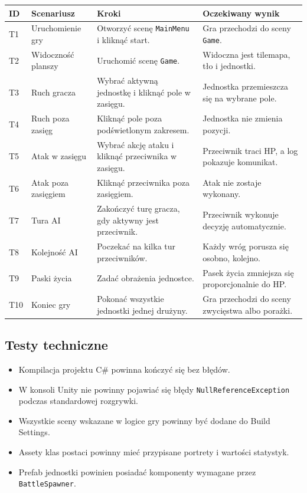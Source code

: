 \documentclass[12pt,a4paper]{article}
\begin{document}
\begin{longtable}{p{1cm} p{4cm} p{5cm} p{4cm}}
\toprule
\textbf{ID} & \textbf{Scenariusz} & \textbf{Kroki} & \textbf{Oczekiwany wynik} \\
\midrule
\endhead
T1 & Uruchomienie gry & Otworzyć scenę \texttt{MainMenu} i kliknąć start. & Gra przechodzi do sceny \texttt{Game}. \\[4pt]
T2 & Widoczność planszy & Uruchomić scenę \texttt{Game}. & Widoczna jest tilemapa, tło i jednostki. \\[4pt]
T3 & Ruch gracza & Wybrać aktywną jednostkę i kliknąć pole w zasięgu. & Jednostka przemieszcza się na wybrane pole. \\[4pt]
T4 & Ruch poza zasięg & Kliknąć pole poza podświetlonym zakresem. & Jednostka nie zmienia pozycji. \\[4pt]
T5 & Atak w zasięgu & Wybrać akcję ataku i kliknąć przeciwnika w zasięgu. & Przeciwnik traci HP, a log pokazuje komunikat. \\[4pt]
T6 & Atak poza zasięgiem & Kliknąć przeciwnika poza zasięgiem. & Atak nie zostaje wykonany. \\[4pt]
T7 & Tura AI & Zakończyć turę gracza, gdy aktywny jest przeciwnik. & Przeciwnik wykonuje decyzję automatycznie. \\[4pt]
T8 & Kolejność AI & Poczekać na kilka tur przeciwników. & Każdy wróg porusza się osobno, kolejno. \\[4pt]
T9 & Paski życia & Zadać obrażenia jednostce. & Pasek życia zmniejsza się proporcjonalnie do HP. \\[4pt]
T10 & Koniec gry & Pokonać wszystkie jednostki jednej drużyny. & Gra przechodzi do sceny zwycięstwa albo porażki. \\
\bottomrule
\end{longtable}

\subsection{Testy techniczne}

\begin{itemize}
    \item Kompilacja projektu C\# powinna kończyć się bez błędów.
    \item W konsoli Unity nie powinny pojawiać się błędy \texttt{NullReferenceException} podczas standardowej rozgrywki.
    \item Wszystkie sceny wskazane w logice gry powinny być dodane do Build Settings.
    \item Assety klas postaci powinny mieć przypisane portrety i wartości statystyk.
    \item Prefab jednostki powinien posiadać komponenty wymagane przez \texttt{BattleSpawner}.
\end{itemize}
\end{document}
